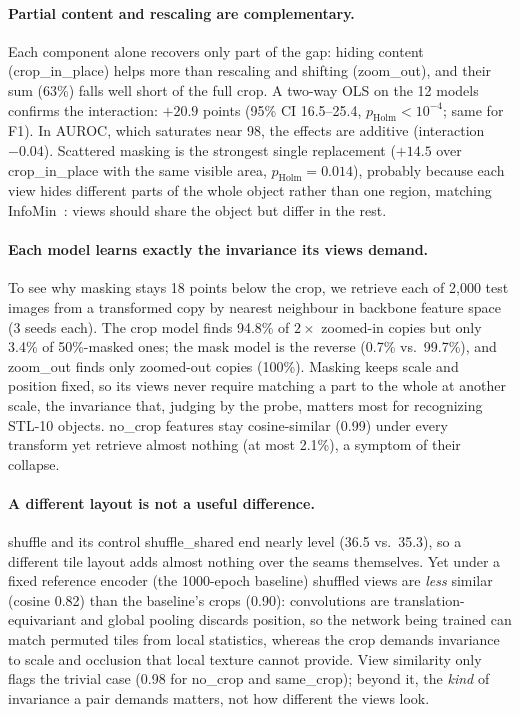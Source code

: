 \documentclass[10pt,twocolumn,letterpaper]{article}
\begin{document}
\paragraph{Partial content and rescaling are complementary.}
Each component alone recovers only part of the gap: hiding content (crop\_in\_place) helps more than rescaling and shifting (zoom\_out), and their sum (63\%) falls well short of the full crop. A two-way OLS on the 12 models confirms the interaction: $+20.9$ points (95\% CI 16.5--25.4, $p_\text{Holm}<10^{-4}$; same for F1). In AUROC, which saturates near 98, the effects are additive (interaction $-0.04$).
Scattered masking is the strongest single replacement ($+14.5$ over crop\_in\_place with the same visible area, $p_\text{Holm}{=}0.014$), probably because each view hides different parts of the whole object rather than one region, matching InfoMin~\cite{tian2020infomin}: views should share the object but differ in the rest.

\paragraph{Each model learns exactly the invariance its views demand.}
To see why masking stays 18 points below the crop, we retrieve each of 2,000 test images from a transformed copy by nearest neighbour in backbone feature space (3 seeds each).
The crop model finds 94.8\% of $2\times$ zoomed-in copies but only 3.4\% of 50\%-masked ones; the mask model is the reverse (0.7\% vs.\ 99.7\%), and zoom\_out finds only zoomed-out copies (100\%).
Masking keeps scale and position fixed, so its views never require matching a part to the whole at another scale, the invariance that, judging by the probe, matters most for recognizing STL-10 objects.
no\_crop features stay cosine-similar (0.99) under every transform yet retrieve almost nothing (at most 2.1\%), a symptom of their collapse.

\paragraph{A different layout is not a useful difference.}
shuffle and its control shuffle\_shared end nearly level (36.5 vs.\ 35.3), so a different tile layout adds almost nothing over the seams themselves.
Yet under a fixed reference encoder (the 1000-epoch baseline) shuffled views are \emph{less} similar (cosine 0.82) than the baseline's crops (0.90): convolutions are translation-equivariant and global pooling discards position, so the network being trained can match permuted tiles from local statistics, whereas the crop demands invariance to scale and occlusion that local texture cannot provide.
View similarity only flags the trivial case (0.98 for no\_crop and same\_crop); beyond it, the \emph{kind} of invariance a pair demands matters, not how different the views look.
\end{document}
